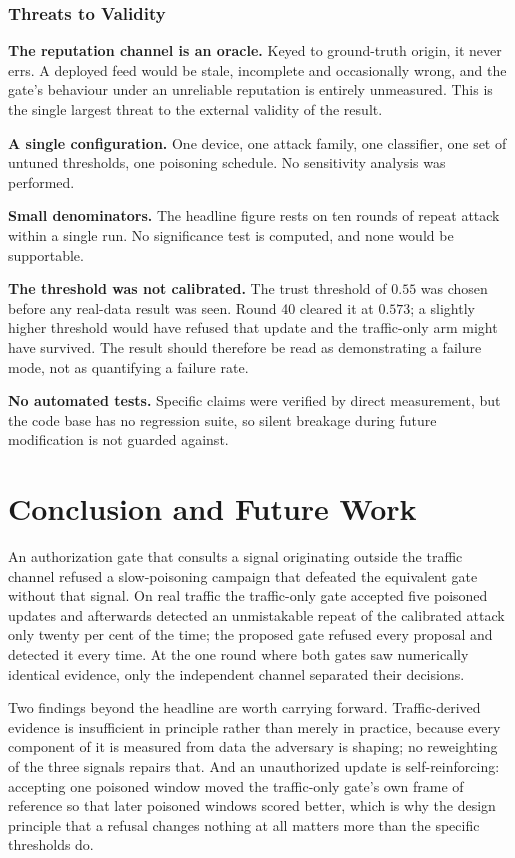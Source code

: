\documentclass[12pt,a4paper]{report}
\begin{document}
\subsection{Threats to Validity}

\textbf{The reputation channel is an oracle.} Keyed to ground-truth origin, it
never errs. A deployed feed would be stale, incomplete and occasionally wrong,
and the gate's behaviour under an unreliable reputation is entirely unmeasured.
This is the single largest threat to the external validity of the result.

\textbf{A single configuration.} One device, one attack family, one classifier,
one set of untuned thresholds, one poisoning schedule. No sensitivity analysis
was performed.

\textbf{Small denominators.} The headline figure rests on ten rounds of repeat
attack within a single run. No significance test is computed, and none would be
supportable.

\textbf{The threshold was not calibrated.} The trust threshold of $0.55$ was
chosen before any real-data result was seen. Round 40 cleared it at $0.573$; a
slightly higher threshold would have refused that update and the traffic-only arm
might have survived. The result should therefore be read as demonstrating a
failure mode, not as quantifying a failure rate.

\textbf{No automated tests.} Specific claims were verified by direct measurement,
but the code base has no regression suite, so silent breakage during future
modification is not guarded against.

\chapter{Conclusion and Future Work}

An authorization gate that consults a signal originating outside the traffic
channel refused a slow-poisoning campaign that defeated the equivalent gate
without that signal. On real traffic the traffic-only gate accepted five poisoned
updates and afterwards detected an unmistakable repeat of the calibrated attack
only twenty per cent of the time; the proposed gate refused every proposal and
detected it every time. At the one round where both gates saw numerically
identical evidence, only the independent channel separated their decisions.

Two findings beyond the headline are worth carrying forward. Traffic-derived
evidence is insufficient in principle rather than merely in practice, because
every component of it is measured from data the adversary is shaping; no
reweighting of the three signals repairs that. And an unauthorized update is
self-reinforcing: accepting one poisoned window moved the traffic-only gate's own
frame of reference so that later poisoned windows scored better, which is why the
design principle that a refusal changes nothing at all matters more than the
specific thresholds do.
\end{document}
